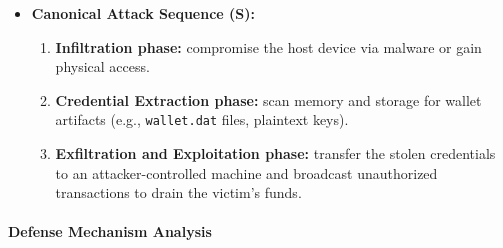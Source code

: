 \begin{itemize}
    \item \textbf{Canonical Attack Sequence (S):}
    \begin{enumerate}
        \item \textbf{Infiltration phase:} compromise the host device via malware or gain physical access.
        \item \textbf{Credential Extraction phase:} scan memory and storage for wallet artifacts (e.g., \texttt{wallet.dat} files, plaintext keys).
        \item \textbf{Exfiltration and Exploitation phase:} transfer the stolen credentials to an attacker-controlled machine and broadcast unauthorized transactions to drain the victim's funds.
    \end{enumerate}
\end{itemize}

\paragraph{Defense Mechanism Analysis}

